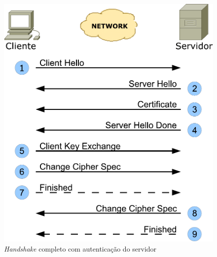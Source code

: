 \begin{figure}[htp]
    \centering
        \includegraphics[scale=0.5]{fig/hs_server_auth}
    \caption{\emph{Handshake} completo com autenticação do servidor}
    \label{fig:hs_server_auth}
\end{figure}


